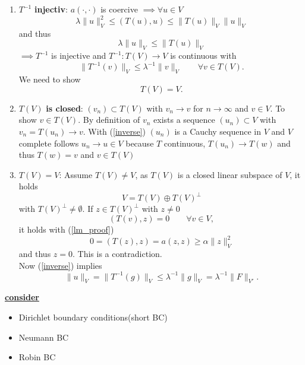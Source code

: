 \begin{enumerate}[=label=(\alph*)]
	\item  $T^{-1}$\textbf{ injectiv}: \enter
	$a(\cdot, \cdot)$ is coercive $\implies \forall u \in V$
	\begin{equation*}
		\lambda \|u\|^2_V \leq (T(u),u) \leq \|T(u)\|_V\|u\|_V
	\end{equation*}
	and thus 
	\begin{equation}\label{inverse}
		\lambda \|u\|_V \leq \|T(u)\|_V
	\end{equation}
	$\implies T^{-1}$ is injective and $T^{-1}: T(V) \to V$ is continuous with
	\begin{equation*}
		\|T^{-1}(v)\|_V \leq \lambda^{-1}\|v\|_V \qquad \forall v \in T(V). 
	\end{equation*}
	We need to show
	\begin{equation*}
		T(V) = V.
	\end{equation*}
	\item $T(V)$ \textbf{is closed}:\enter
	 $(v_n) \subset T(V)$ with $v_n \to v$ for $n \to \infty$ and $v \in V$. To show $v \in T(V)$. By definition of $v_n$ exists a sequence $(u_n) \subset V$ with $v_n = T(u_n) \to v$. With (\ref{inverse}) $(u_n)$ is a Cauchy sequence in $V$ and $V$ complete follows $u_n \to u \in V$ because $T$ continuous, $T(u_n) \to T(w)$ and thus $T(w)=v$ and $v \in T(V)$\enter
	\item $T(V) = V$:\enter
	 Assume $T(V) \neq V$, as $T(V)$ is a closed linear subspace of $V$, it holds 
	\begin{equation*}
		V = T(V) \oplus T(V)^\perp
	\end{equation*}
	with $T(V)^\perp \neq \emptyset$. If $z \in T(V)^\perp $ with $z \neq 0$
	\begin{equation*}
		(T(v),z) = 0 \qquad \forall v \in V,
	\end{equation*}
	it holds with (\ref{lm_proof}) 
	\begin{equation*}
		0 = (T(z),z) = a(z,z) \geq \alpha \|z\|^2_V
	\end{equation*}
	and thus $z = 0$. This is a contradiction.\\
	Now (\ref{inverse}) implies
	\begin{equation*}
		\|u\|_V = \|T^{-1}(g)\|_V \leq \lambda^{-1}\|g\|_V = \lambda^{-1}\|F\|_{V'}.
	\end{equation*}
\end{enumerate}

\textbf{\underline{consider}}
\begin{itemize}
	\item Dirichlet boundary conditions(short BC)\enter
	\item Neumann BC\enter
	\item Robin BC
\end{itemize}


